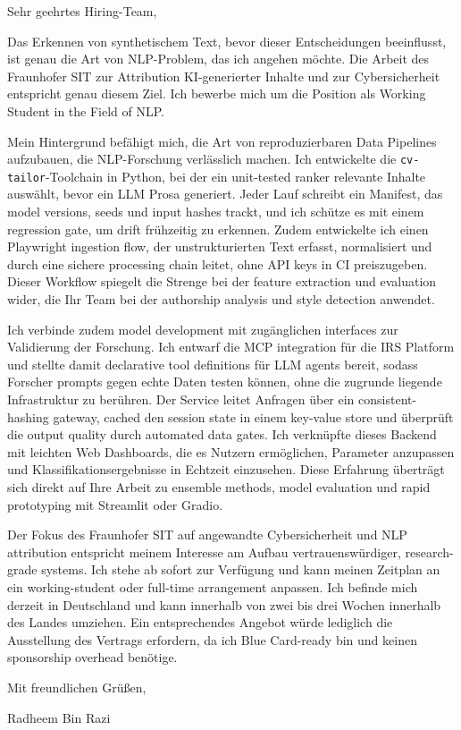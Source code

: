 \documentclass[11pt,a4paper]{coverletter}
\begin{document}

\opening{Sehr geehrtes Hiring-Team,}

Das Erkennen von synthetischem Text, bevor dieser Entscheidungen beeinflusst, ist genau die Art von NLP-Problem, das ich angehen möchte. Die Arbeit des Fraunhofer SIT zur Attribution KI-generierter Inhalte und zur Cybersicherheit entspricht genau diesem Ziel. Ich bewerbe mich um die Position als Working Student in the Field of NLP.

Mein Hintergrund befähigt mich, die Art von reproduzierbaren Data Pipelines aufzubauen, die NLP-Forschung verlässlich machen. Ich entwickelte die \texttt{cv-tailor}-Toolchain in Python, bei der ein unit-tested ranker relevante Inhalte auswählt, bevor ein LLM Prosa generiert. Jeder Lauf schreibt ein Manifest, das model versions, seeds und input hashes trackt, und ich schütze es mit einem regression gate, um drift frühzeitig zu erkennen. Zudem entwickelte ich einen Playwright ingestion flow, der unstrukturierten Text erfasst, normalisiert und durch eine sichere processing chain leitet, ohne API keys in CI preiszugeben. Dieser Workflow spiegelt die Strenge bei der feature extraction und evaluation wider, die Ihr Team bei der authorship analysis und style detection anwendet.

Ich verbinde zudem model development mit zugänglichen interfaces zur Validierung der Forschung. Ich entwarf die MCP integration für die IRS Platform und stellte damit declarative tool definitions für LLM agents bereit, sodass Forscher prompts gegen echte Daten testen können, ohne die zugrunde liegende Infrastruktur zu berühren. Der Service leitet Anfragen über ein consistent-hashing gateway, cached den session state in einem key-value store und überprüft die output quality durch automated data gates. Ich verknüpfte dieses Backend mit leichten Web Dashboards, die es Nutzern ermöglichen, Parameter anzupassen und Klassifikationsergebnisse in Echtzeit einzusehen. Diese Erfahrung überträgt sich direkt auf Ihre Arbeit zu ensemble methods, model evaluation und rapid prototyping mit Streamlit oder Gradio.

Der Fokus des Fraunhofer SIT auf angewandte Cybersicherheit und NLP attribution entspricht meinem Interesse am Aufbau vertrauenswürdiger, research-grade systems. Ich stehe ab sofort zur Verfügung und kann meinen Zeitplan an ein working-student oder full-time arrangement anpassen. Ich befinde mich derzeit in Deutschland und kann innerhalb von zwei bis drei Wochen innerhalb des Landes umziehen. Ein entsprechendes Angebot würde lediglich die Ausstellung des Vertrags erfordern, da ich Blue Card-ready bin und keinen sponsorship overhead benötige.

\closing{Mit freundlichen Grüßen,}{Radheem Bin Razi}
\end{document}

